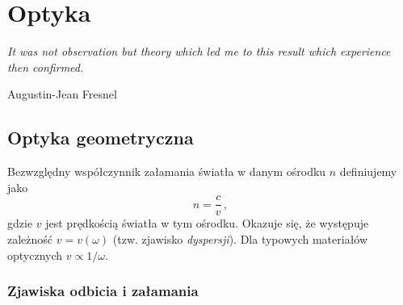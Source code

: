 \documentclass[../main.tex]{subfiles}
\begin{document}
\section{Optyka}
\textit{It was not observation but theory which led me to this result which experience then
confirmed.}\begin{flushright}Augustin-Jean Fresnel\end{flushright}
\begin{center}
    \pgfspectra[width=10 cm, height=2cm, axis, axis color=white, axis font color=black]
\end{center}
\subsection{Optyka geometryczna}
Bezwzględny współczynnik załamania światła w danym ośrodku \(n\) definiujemy jako
\begin{equation*}
    n=\frac{c}{v}\,,
\end{equation*}
gdzie \(v\) jest prędkością światła w tym ośrodku. Okazuje się, że występuje zależność
\(v=v(\omega)\) (tzw. zjawisko \textit{dyspersji}). Dla typowych materiałów optycznych
\(v\propto1/\omega\).
\subsubsection{Zjawiska odbicia i załamania}
\noindent{}
\medskip

\noindent{}
\end{document}
